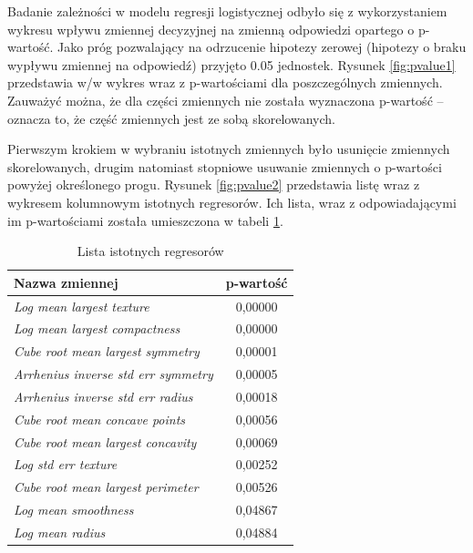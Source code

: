 Badanie zależności w modelu regresji logistycznej odbyło się z wykorzystaniem wykresu wpływu zmiennej decyzyjnej na zmienną odpowiedzi opartego o p-wartość. Jako próg pozwalający na odrzucenie hipotezy zerowej (hipotezy o braku wypływu zmiennej na odpowiedź) przyjęto 0.05 jednostek. Rysunek \ref{fig:pvalue1} przedstawia w/w wykres wraz z p-wartościami dla poszczególnych zmiennych. Zauważyć można, że dla części zmiennych nie została wyznaczona p-wartość -- oznacza to, że część zmiennych jest ze sobą skorelowanych.

Pierwszym krokiem w wybraniu istotnych zmiennych było usunięcie zmiennych skorelowanych, drugim natomiast stopniowe usuwanie zmiennych o p-wartości powyżej określonego progu. Rysunek \ref{fig:pvalue2} przedstawia listę wraz z wykresem kolumnowym istotnych regresorów. Ich lista, wraz z odpowiadającymi im p-wartościami została umieszczona w tabeli \ref{lin_reg:1}.

\begin{table}
	\centering
	\begin{tabular}{l|c}
		Nazwa zmiennej & p-wartość \\
		\hline
		\textit{Log mean largest texture} & 0,00000 \\
		\textit{Log mean largest compactness} & 0,00000 \\
		\textit{Cube root mean largest symmetry} & 0,00001 \\
		\textit{Arrhenius inverse std err symmetry} & 0,00005 \\
		\textit{Arrhenius inverse std err radius} & 0,00018 \\
		\textit{Cube root mean concave points} & 0,00056 \\
		\textit{Cube root mean largest concavity} & 0,00069 \\
		\textit{Log std err texture} & 0,00252 \\
		\textit{Cube root mean largest perimeter} & 0,00526 \\
		\textit{Log mean smoothness} & 0,04867 \\
		\textit{Log mean radius} & 0,04884
	\end{tabular}
	\caption{Lista istotnych regresorów}
	\label{lin_reg:1}
\end{table}

